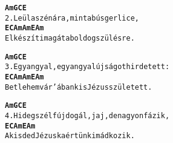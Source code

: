 \begin{minipage}{\textwidth}
\kottastart
{}
\kottaend
\begin{minipage}{\textwidth}
\begin{alltt}
\textbf{    Am      G       C             E}
2. Leül a szénára, mint a bús gerlice,
\textbf{   E     C      Am Am    E      Am}
   Elkészíti magát a boldog szülésre.
\end{alltt}
\vspace{0.0cm}
\versszakspacing
\end{minipage}
\begin{minipage}{\textwidth}
\begin{alltt}
\textbf{   Am          G          C           E}
3. Egy angyal, egy angyal újságot hirdetett:
\textbf{    E    C        Am  Am    E      Am}
   Betlehem vár'ában kis Jézus született.
\end{alltt}
\vspace{0.0cm}
\versszakspacing
\end{minipage}
\begin{minipage}{\textwidth}
\begin{alltt}
\textbf{    Am         G         C              E}
4. Hideg szél fújdogál, jaj, de nagyon fázik,
\textbf{   E     C        Am       E    Am}
   A kisded Jézuska értünk imádkozik.
\end{alltt}
\vspace{0.0cm}
\versszakspacing
\end{minipage}
\end{minipage}
~\vspace{1.0cm}
\newline
